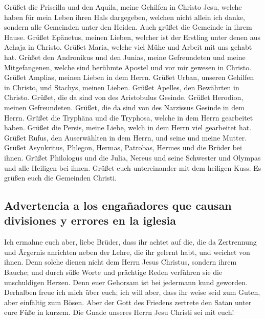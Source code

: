  Grüßet die Priscilla und den Aquila, meine Gehilfen in
Christo Jesu,  welche haben für mein Leben ihren Hals
dargegeben, welchen nicht allein ich danke, sondern alle Gemeinden unter
den Heiden.  Auch grüßet die Gemeinde in ihrem Hause.
Grüßet Epänetus, meinen Lieben, welcher ist der Erstling unter denen aus
Achaja in Christo.  Grüßet Maria, welche viel Mühe und
Arbeit mit uns gehabt hat.  Grüßet den Andronikus und den
Junias, meine Gefreundeten und meine Mitgefangenen, welche sind berühmte
Apostel und vor mir gewesen in Christo.  Grüßet Amplias,
meinen Lieben in dem Herrn.  Grüßet Urban, unseren
Gehilfen in Christo, und Stachys, meinen Lieben.  Grüßet
Apelles, den Bewährten in Christo. Grüßet, die da sind von des
Aristobulus Gesinde.  Grüßet Herodion, meinen
Gefreundeten. Grüßet, die da sind von des Narzissus Gesinde in dem
Herrn.  Grüßet die Tryphäna und die Tryphosa, welche in
dem Herrn gearbeitet haben. Grüßet die Persis, meine Liebe, welch in dem
Herrn viel gearbeitet hat.  Grüßet Rufus, den
Auserwählten in dem Herrn, und seine und meine Mutter. 
Grüßet Asynkritus, Phlegon, Hermas, Patrobas, Hermes und die Brüder bei
ihnen.  Grüßet Philologus und die Julia, Nereus und seine
Schwester und Olympas und alle Heiligen bei ihnen. 
Grüßet euch untereinander mit dem heiligen Kuss. Es grüßen euch die
Gemeinden Christi.

\hypertarget{advertencia-a-los-engauxf1adores-que-causan-divisiones-y-errores-en-la-iglesia}{%
\subsection{Advertencia a los engañadores que causan divisiones y
errores en la
iglesia}\label{advertencia-a-los-engauxf1adores-que-causan-divisiones-y-errores-en-la-iglesia}}

 Ich ermahne euch aber, liebe Brüder, dass ihr achtet auf
die, die da Zertrennung und Ärgernis anrichten neben der Lehre, die ihr
gelernt habt, und weichet von ihnen.  Denn solche dienen
nicht dem Herrn Jesus Christus, sondern ihrem Bauche; und durch süße
Worte und prächtige Reden verführen sie die unschuldigen Herzen.
 Denn euer Gehorsam ist bei jedermann kund geworden.
Derhalben freue ich mich über euch; ich will aber, dass ihr weise seid
zum Guten, aber einfältig zum Bösen.  Aber der Gott des
Friedens zertrete den Satan unter eure Füße in kurzem. Die Gnade unseres
Herrn Jesu Christi sei mit euch!

